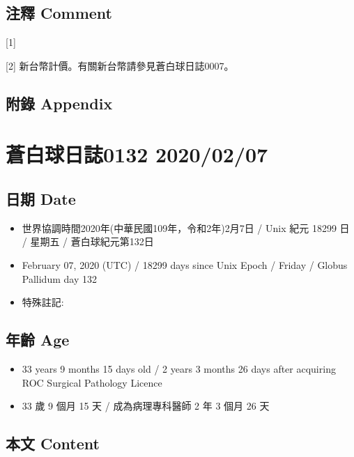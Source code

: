 \documentclass[a5paper, 12pt
]{book}
\providecommand{\tightlist}{%
  \setlength{\itemsep}{0pt}\setlength{\parskip}{0pt}}
\begin{document}
\hypertarget{ux6ce8ux91cb-comment-66}{%
\subsection{注釋 Comment}\label{ux6ce8ux91cb-comment-66}}

{[}1{]}

{[}2{]} 新台幣計價。有關新台幣請參見蒼白球日誌0007。

\hypertarget{ux9644ux9304-appendix-67}{%
\subsection{附錄 Appendix}\label{ux9644ux9304-appendix-67}}

\hypertarget{ux84bcux767dux7403ux65e5ux8a8c0132-20200207}{%
\section{蒼白球日誌0132
2020/02/07}\label{ux84bcux767dux7403ux65e5ux8a8c0132-20200207}}

\hypertarget{ux65e5ux671f-date-68}{%
\subsection{日期 Date}\label{ux65e5ux671f-date-68}}

\begin{itemize}
\tightlist
\item
  世界協調時間2020年(中華民國109年，令和2年)2月7日 / Unix 紀元 18299 日
  / 星期五 / 蒼白球紀元第132日
\item
  February 07, 2020 (UTC) / 18299 days since Unix Epoch / Friday /
  Globus Pallidum day 132
\item
  特殊註記:
\end{itemize}

\hypertarget{ux5e74ux9f61-age-68}{%
\subsection{年齡 Age}\label{ux5e74ux9f61-age-68}}

\begin{itemize}
\tightlist
\item
  33 years 9 months 15 days old / 2 years 3 months 26 days after
  acquiring ROC Surgical Pathology Licence
\item
  33 歲 9 個月 15 天 / 成為病理專科醫師 2 年 3 個月 26 天
\end{itemize}

\hypertarget{ux672cux6587-content-68}{%
\subsection{本文 Content}\label{ux672cux6587-content-68}}
\end{document}
